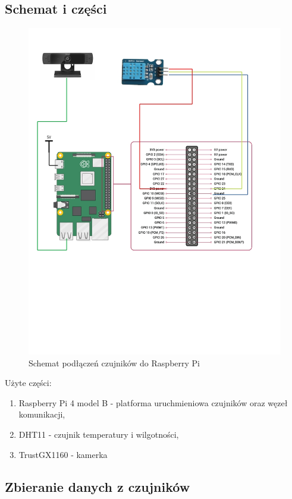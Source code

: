 \documentclass{article}
\begin{document}
\subsection{Schemat i części}
\begin{figure}
  \centering
  \includegraphics[width=\textwidth]{schemat.jpg}
\caption{Schemat podłączeń czujników do Raspberry Pi} \label{fig1}
\end{figure}
Użyte części:
\begin{enumerate}
\item Raspberry Pi 4 model B - platforma uruchmieniowa czujników oraz węzeł komunikacji,
\item DHT11 - czujnik temperatury i wilgotności,
\item TrustGX1160 - kamerka
\end{enumerate}

\subsection{Zbieranie danych z czujników}
\end{document}
